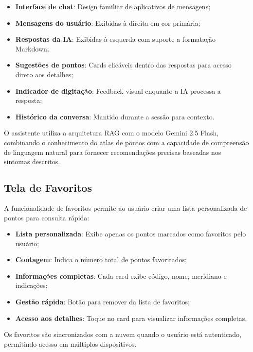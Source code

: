 \begin{itemize}
    \item \textbf{Interface de chat}: Design familiar de aplicativos de mensagens;
    \item \textbf{Mensagens do usuário}: Exibidas à direita em cor primária;
    \item \textbf{Respostas da IA}: Exibidas à esquerda com suporte a formatação Markdown;
    \item \textbf{Sugestões de pontos}: Cards clicáveis dentro das respostas para acesso direto aos detalhes;
    \item \textbf{Indicador de digitação}: Feedback visual enquanto a IA processa a resposta;
    \item \textbf{Histórico da conversa}: Mantido durante a sessão para contexto.
\end{itemize}

O assistente utiliza a arquitetura RAG com o modelo Gemini 2.5 Flash, combinando o conhecimento do atlas de pontos com a capacidade de compreensão de linguagem natural para fornecer recomendações precisas baseadas nos sintomas descritos.


\subsection{Tela de Favoritos}

A funcionalidade de favoritos permite ao usuário criar uma lista personalizada de pontos para consulta rápida:

\begin{itemize}
    \item \textbf{Lista personalizada}: Exibe apenas os pontos marcados como favoritos pelo usuário;
    \item \textbf{Contagem}: Indica o número total de pontos favoritados;
    \item \textbf{Informações completas}: Cada card exibe código, nome, meridiano e indicações;
    \item \textbf{Gestão rápida}: Botão para remover da lista de favoritos;
    \item \textbf{Acesso aos detalhes}: Toque no card para visualizar informações completas.
\end{itemize}

Os favoritos são sincronizados com a nuvem quando o usuário está autenticado, permitindo acesso em múltiplos dispositivos.

